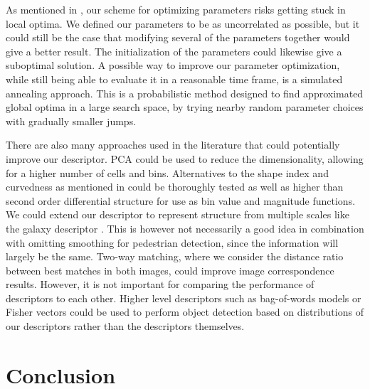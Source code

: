 \documentclass[thesis.tex]{subfiles}
\begin{document}
As mentioned in , our scheme for optimizing parameters risks getting stuck in local optima. We defined our parameters to be as uncorrelated as possible, but it could still be the case that modifying several of the parameters together would give a better result. The initialization of the parameters could likewise give a suboptimal solution. A possible way to improve our parameter optimization, while still being able to evaluate it in a reasonable time frame, is a simulated annealing approach. This is a probabilistic method designed to find approximated global optima in a large search space, by trying nearby random parameter choices with gradually smaller jumps. 

There are also many approaches used in the literature that could potentially improve our descriptor. PCA could be used to reduce the dimensionality, allowing for a higher number of cells and bins. Alternatives to the shape index and curvedness as mentioned in  could be thoroughly tested as well as higher than second order differential structure for use as bin value and magnitude functions. We could extend our descriptor to represent structure from multiple scales like the galaxy descriptor . This is however not necessarily a good idea in combination with omitting smoothing for pedestrian detection, since the information will largely be the same. Two-way matching, where we consider the distance ratio between best matches in both images, could improve image correspondence results. However, it is not important for comparing the performance of descriptors to each other. Higher level descriptors such as bag-of-words models or Fisher vectors \cite{sanchez2013image} could be used to perform object detection based on distributions of our descriptors rather than the descriptors themselves.

\section{Conclusion}

\subbibliography
\end{document}
